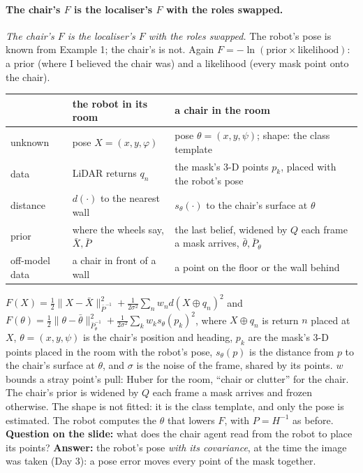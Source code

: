 \documentclass[11pt]{article}
\newcommand{\slt}[1]{\emph{#1}}   %
\begin{document}
\paragraph{The chair's $F$ is the localiser's $F$ with the roles swapped.} \slt{The chair's $F$ is the localiser's $F$ with the roles swapped.} The robot's pose is known from Example 1; the chair's is not. Again $F=-\ln(\text{prior}\times\text{likelihood})$: a prior (where I believed the chair was) and a likelihood (every mask point onto the chair).
\begin{center}\small
\begin{tabular}{@{}p{2.3cm}p{5.6cm}p{6.2cm}@{}}
\toprule
& the robot in its room & a chair in the room\\\midrule
unknown & pose $X=(x,y,\varphi)$ & pose $\theta=(x,y,\psi)$; shape: the class template\\
data & LiDAR returns $q_n$ & the mask's 3-D points $p_k$, placed with the robot's pose\\
distance & $d(\cdot)$ to the nearest wall & $s_\theta(\cdot)$ to the chair's surface at $\theta$\\
prior & where the wheels say, $\bar X,\bar P$ & the last belief, widened by $Q$ each frame a mask arrives, $\bar\theta,\bar P_\theta$\\
off-model data & a chair in front of a wall & a point on the floor or the wall behind\\
\bottomrule
\end{tabular}
\end{center}
$F(X)=\tfrac12\|X-\bar X\|^2_{\bar P^{-1}}+\frac1{2\sigma^2}\sum_nw_nd(X\oplus q_n)^2$ and $F(\theta)=\tfrac12\|\theta-\bar\theta\|^2_{\bar P_\theta^{-1}}+\frac1{2\sigma^2}\sum_kw_ks_\theta(p_k)^2$, where $X\oplus q_n$ is return $n$ placed at $X$, $\theta=(x,y,\psi)$ is the chair's position and heading, $p_k$ are the mask's 3-D points placed in the room with the robot's pose, $s_\theta(p)$ is the distance from $p$ to the chair's surface at $\theta$, and $\sigma$ is the noise of the frame, shared by its points. $w$ bounds a stray point's pull: Huber for the room, ``chair or clutter'' for the chair. The chair's prior is widened by $Q$ each frame a mask arrives and frozen otherwise. The shape is not fitted: it is the class template, and only the pose is estimated. The robot computes the $\theta$ that lowers $F$, with $P=H^{-1}$ as before. \textbf{Question on the slide:} what does the chair agent read from the robot to place its points? \textbf{Answer:} the robot's pose \emph{with its covariance}, at the time the image was taken (Day 3): a pose error moves every point of the mask together.
\end{document}
